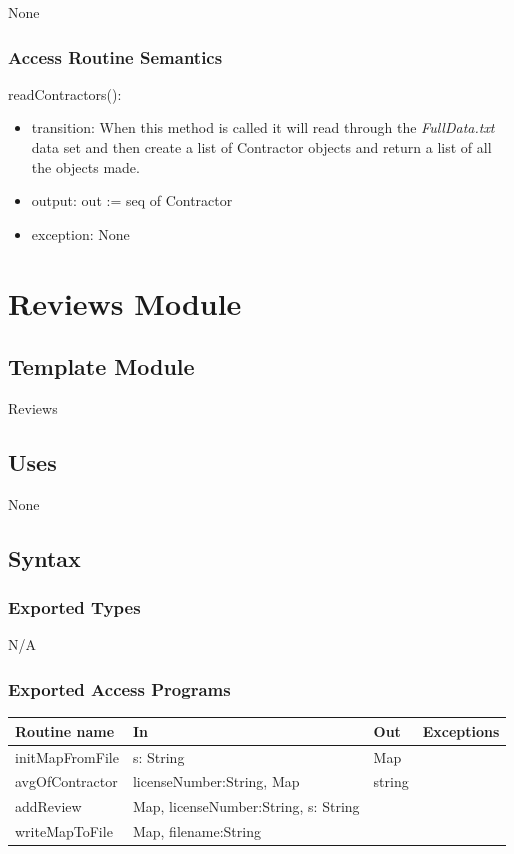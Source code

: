 \documentclass[12pt]{scrartcl}
\begin{document}
None

\subsubsection {Access Routine Semantics}

readContractors():
\begin{itemize}
\item transition:  When this method is called it will read through the \textit{FullData.txt} data set and then create a list of Contractor objects and return a list of all the objects made.
\item output: out := seq of Contractor
\item exception: None
\end{itemize}


\newpage

\section {Reviews Module}

\subsection{Template Module}

Reviews

\subsection {Uses}

None

\subsection {Syntax}

\subsubsection {Exported Types}

N/A

\subsubsection {Exported Access Programs}

\begin{tabular}{| l | l | l | l |}
\hline
\textbf{Routine name} & \textbf{In} & \textbf{Out} & \textbf{Exceptions}\\
\hline
initMapFromFile & s: String &  Map & \\
\hline
avgOfContractor & licenseNumber:String, Map & string &\\
\hline 
addReview & Map, licenseNumber:String, s: String & & \\
\hline
writeMapToFile & Map, filename:String & & \\
\hline
\end{tabular}
\end{document}

